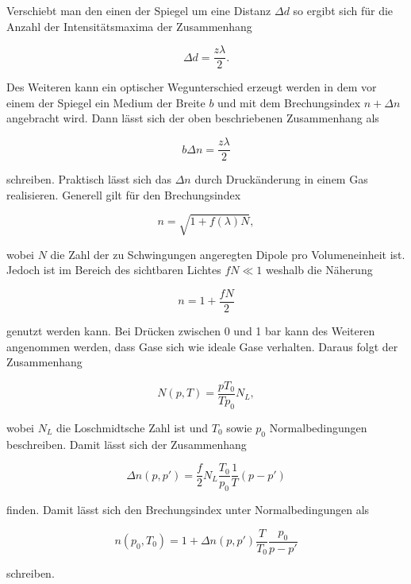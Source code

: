 Verschiebt man den einen der Spiegel um eine Distanz $\Delta d$ so ergibt sich für die Anzahl der Intensitätsmaxima der Zusammenhang

\begin{equation}
    \label{eqn:verschieben}
    \Delta d = \frac{z \lambda}{2}.
\end{equation}

Des Weiteren kann ein optischer Wegunterschied erzeugt werden in dem vor einem der Spiegel ein Medium der Breite $b$ und mit dem Brechungsindex $n + \Delta n$ angebracht wird.
Dann lässt sich der oben beschriebenen Zusammenhang als

\begin{equation}
    \label{eqn:brech}
    b \Delta n = \frac{z \lambda}{2}
\end{equation}

schreiben.
Praktisch lässt sich das $\Delta n$ durch Druckänderung in einem Gas realisieren. Generell gilt für den Brechungsindex

\begin{equation}
    n = \sqrt{1 + f(\lambda) N},
\end{equation}

wobei $N$ die Zahl der zu Schwingungen angeregten Dipole pro Volumeneinheit ist. Jedoch ist im Bereich des sichtbaren Lichtes $fN \ll 1$ weshalb die Näherung

\begin{equation}
    n = 1 + \frac{fN}{2}
\end{equation}

genutzt werden kann. Bei Drücken zwischen 0 und 1 bar kann des Weiteren angenommen werden, dass Gase sich wie ideale Gase verhalten.
Daraus folgt der Zusammenhang

\begin{equation}
    N(p, T) = \frac{pT_0}{Tp_0}N_L,
\end{equation}

wobei $N_L$ die Loschmidtsche Zahl ist und $T_0$ sowie $p_0$ Normalbedingungen beschreiben.
Damit lässt sich der Zusammenhang

\begin{equation}
    \label{eqn:delta-n}
    \Delta n (p, p') = \frac{f}{2} N_L \frac{T_0}{p_0} \frac{1}{T}(p-p')
\end{equation}

finden. Damit lässt sich den Brechungsindex unter Normalbedingungen als

\begin{equation}
    \label{eqn:n-final}
    n (p_0, T_0) = 1 + \Delta n(p, p') \frac{T}{T_0}\frac{p_0}{p-p'}
\end{equation}

schreiben.
